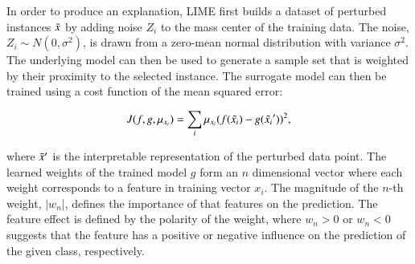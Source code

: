 In order to produce an explanation, LIME first builds a dataset of perturbed instances $\Tilde{x}$ by adding noise $Z_i$ to the mass center of the training data. The noise, $Z_i \sim N(0,\sigma^2)$, is drawn from a zero-mean normal distribution with variance $\sigma^2$. The underlying model can then be used to generate a sample set that is weighted by their proximity to the selected instance. The surrogate model can then be trained using a cost function of the mean squared error:

\begin{equation}
    J(f,g,\mu_{x_i}) = \sum_i \mu_{x_i}(f(\Tilde{x_i}) - g(\Tilde{x_i}'))^{2},
\end{equation}

\noindent
where $\Tilde{x}'$ is the interpretable representation of the perturbed data point. The learned weights of the trained model $g$ form an $n$ dimensional vector where each weight corresponds to a feature in training vector $x_i$. The magnitude of the $n$-th weight, $|w_n|$, defines the importance of that features on the prediction. The feature effect is defined by the polarity of the weight, where $w_n > 0$ or $w_n < 0$ suggests that the feature has a positive or negative influence on the prediction of the given class, respectively.

%




